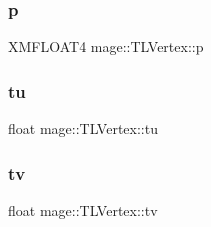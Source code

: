 \subsubsection{\texorpdfstring{p}{p}}
{\footnotesize\ttfamily X\+M\+F\+L\+O\+A\+T4 mage\+::\+T\+L\+Vertex\+::p}

\hypertarget{structmage_1_1_t_l_vertex_a33bec24f83d1daf690caf2ca2ead933b}{}\label{structmage_1_1_t_l_vertex_a33bec24f83d1daf690caf2ca2ead933b} 
\subsubsection{\texorpdfstring{tu}{tu}}
{\footnotesize\ttfamily float mage\+::\+T\+L\+Vertex\+::tu}

\hypertarget{structmage_1_1_t_l_vertex_aa82b030c0de9e7fe2403b6f540b2149b}{}\label{structmage_1_1_t_l_vertex_aa82b030c0de9e7fe2403b6f540b2149b} 
\subsubsection{\texorpdfstring{tv}{tv}}
{\footnotesize\ttfamily float mage\+::\+T\+L\+Vertex\+::tv}

